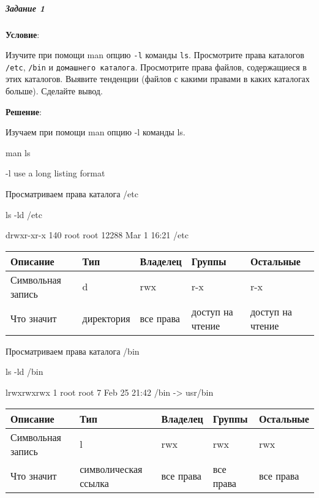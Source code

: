 \subparagraph{Задание 1} \textbf{Условие}:

Изучите при помощи man опцию \verb|-l| команды \verb|ls|.
Просмотрите права каталогов \verb|/etc|, \verb|/bin| и \verb|домашнего каталога|. Просмотрите права файлов, содержащиеся в этих каталогов. Выявите тенденции (файлов с какими правами в каких каталогах больше).
Сделайте вывод.

\textbf{Решение}:

Изучаем при помощи man опцию -l команды ls.

\begin{BashBox}
    man ls
\end{BashBox}

\begin{OutBox}
        -l     use a long listing format
\end{OutBox}

Просматриваем права каталога /etc

\begin{BashBox}
    ls -ld /etc
\end{BashBox}

\begin{OutBox}
    drwxr-xr-x 140 root root 12288 Mar  1 16:21 /etc
\end{OutBox}

\begin{table}[h!]
    \centering
    \begin{tabular}{ | l | l | l | l | l | }
        \hline
        Описание            & Тип       & Владелец  & Группы            & Остальные       \\ \hline
        \hline
        Символьная  запись  & d         & rwx       & r-x               & r-x             \\ \hline
        Что значит          & директория& все права & доступ на чтение  & доступ на чтение\\ \hline
    \end{tabular}
\end{table}

Просматриваем права каталога /bin

\begin{BashBox}
    ls -ld /bin
\end{BashBox}

\begin{OutBox}
    lrwxrwxrwx 1 root root 7 Feb 25 21:42 /bin -> usr/bin
\end{OutBox}

\begin{table}[h!]
    \centering
    \begin{tabular}{ | l | l | l | l | l | }
        \hline
        Описание            & Тип 	                & Владелец  & Группы    & Остальные \\ \hline
        \hline
        Символьная запись   & l 	                & rwx       & rwx       & rwx       \\ \hline
        Что значит          & символическая ссылка  & все права & все права & все права \\ \hline
    \end{tabular}
\end{table}

